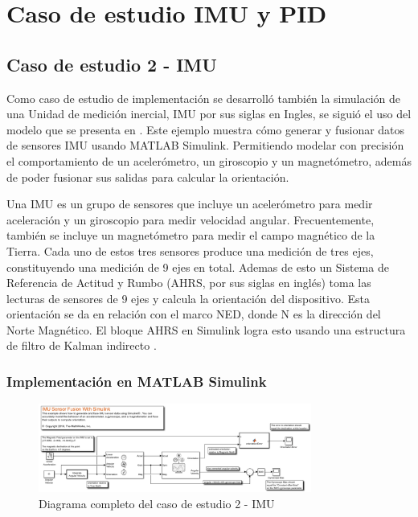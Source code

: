 \chapter{Caso de estudio IMU y PID}
\label{ch:especifico3}

\section{Caso de estudio 2 - IMU}

Como caso de estudio de implementación se desarrolló también la simulación de una Unidad de medición inercial, IMU por sus siglas en Ingles, se siguió el uso del modelo que se presenta en \cite{mathworks2024imu}. Este ejemplo muestra cómo generar y fusionar datos de sensores IMU usando MATLAB Simulink. Permitiendo modelar con precisión el comportamiento de un acelerómetro, un giroscopio y un magnetómetro, además de poder fusionar sus salidas para calcular la orientación.

Una IMU es un grupo de sensores que incluye un acelerómetro para medir aceleración y un giroscopio para medir velocidad angular. Frecuentemente, también se incluye un magnetómetro para medir el campo magnético de la Tierra. Cada uno de estos tres sensores produce una medición de tres ejes, constituyendo una medición de 9 ejes en total. Ademas de esto un Sistema de Referencia de Actitud y Rumbo (AHRS, por sus siglas en inglés) toma las lecturas de sensores de 9 ejes y calcula la orientación del dispositivo. Esta orientación se da en relación con el marco NED, donde N es la dirección del Norte Magnético. El bloque AHRS en Simulink logra esto usando una estructura de filtro de Kalman indirecto \cite{mathworks2024imu}.

\newpage
\subsection{Implementación en MATLAB Simulink}

\begin{figure}[h!]
    \centering
    \includegraphics[width=0.8\textwidth]{fig/Capitulo5/Caso_de_estudio_IMU/FULL_IMU.pdf}
    \caption{Diagrama completo del caso de estudio 2 - IMU \cite{mathworks2024imu}}
    \label{fig:caso_de_estudio_2_IMU}
\end{figure}


